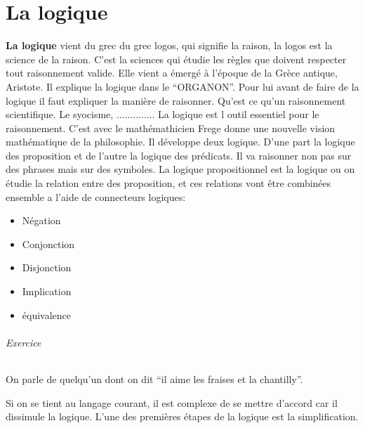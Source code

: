 \documentclass[11pt,a4paper]{article} %
\begin{document}
\part{La logique}
\textbf{La logique} vient du grec du grec logos, qui signifie la raison, la logos est la science de la raison. C'est la sciences qui étudie les règles que doivent respecter tout raisonnement valide. Elle vient a émergé à l'époque de la Grèce antique, Aristote. Il explique la logique dans le ``ORGANON''. Pour lui avant de faire de la logique il faut expliquer la manière de raisonner. Qu'est ce qu'un raisonnement scientifique. Le syocisme, .............. La logique est l outil essentiel pour le raisonnement. C'est avec le mathémathicien Frege donne une nouvelle vision mathématique de la philosophie. Il développe deux logique. D'une part la logique des proposition et de l'autre la logique des prédicats. Il va raisonner non pas sur des phrases mais sur des symboles. La logique propositionnel est la logique ou on étudie  la relation entre des proposition, et ces relations vont être combinées ensemble a l'aide de connecteurs logiques:\\
\begin{itemize}
	\item Négation
	\item Conjonction
	\item Disjonction
	\item Implication
	\item équivalence
\end{itemize}
\paragraph{Exercice}
On parle de quelqu'un dont on dit ``il aime les fraises et la chantilly''.

Si on se tient au langage courant, il est complexe de se mettre d'accord car il dissimule la logique. L'une des premières étapes de la logique est la simplification.\\
\end{document}
